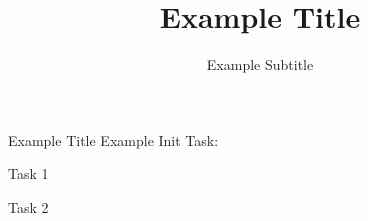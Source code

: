 \documentclass{uulm-exercise-layout}
\title{Example Title}
\subtitle{Example Subtitle}
\institute{Example Institute}
\begin{document}
   \maketitle

   \begin{exercise}{Example Title}
      Example Init Task:
      \begin{tasks}
         \item Task 1
         \item Task 2
      \end{tasks}
   \end{exercise}
\end{document}
